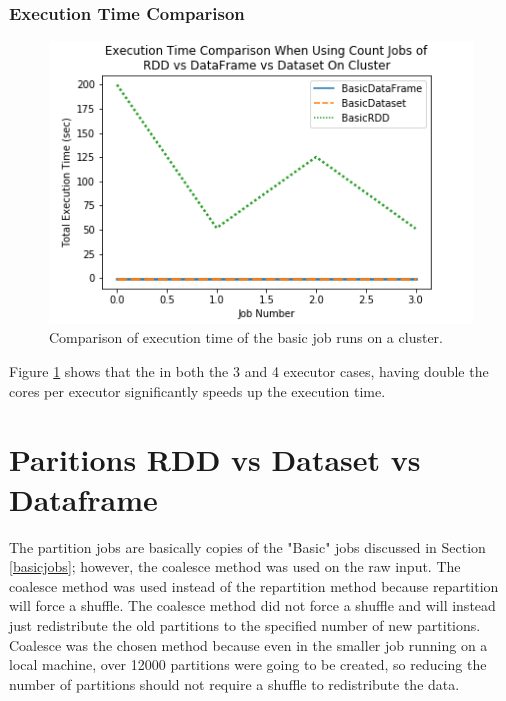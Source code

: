 \documentclass[conference]{IEEEtran}
\begin{document}
\subsubsection{Execution Time Comparison}
\begin{figure}
    \includegraphics[width=\linewidth]{../python_scripts/images/basicJobsAllExecutionTimeCluster.png}
    \caption{Comparison of execution time of the basic job runs on a cluster.}
    \label{fig:basicJobsAllExecutionTimeCluster}
\end{figure}

Figure \ref{fig:basicJobsAllExecutionTimeCluster} shows that the in both the 3 and 4 executor cases, having double the cores per executor significantly speeds up the execution time.

\section{Paritions RDD vs Dataset vs Dataframe}\label{section:partition}
The partition jobs are basically copies of the "Basic" jobs discussed in Section \ref{basicjobs}; however, the coalesce method was used on the raw input.
The coalesce method was used instead of the repartition method because repartition will force a shuffle.
The coalesce method did not force a shuffle and will instead just redistribute the old partitions to the specified number of new partitions.
Coalesce was the chosen method because even in the smaller job running on a local machine, over 12000 partitions were going to be created, so reducing the number of partitions should not require a shuffle to redistribute the data.
\end{document}
